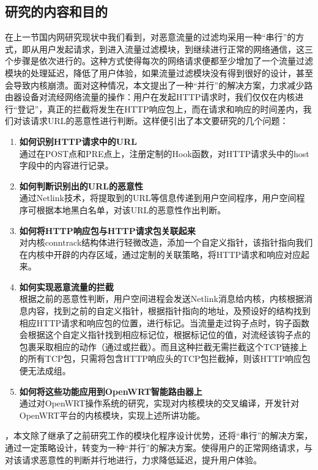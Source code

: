 \documentclass[a4paper,onecolumn,UTF8]{ctexart}
\begin{document}
\subsection{研究的内容和目的}
在上一节国内网研究现状中我们看到，对恶意流量的过滤均采用一种“串行”的方式，即从用户发起请求，到进入流量过滤模块，到继续进行正常的网络通信，这三个步骤是依次进行的。这种方式使得每次的网络请求便都至少增加了一个流量过滤模块的处理延迟，降低了用户体验，如果流量过滤模块没有得到很好的设计，甚至会导致内核崩溃。面对这种情况，本文提出了一种“并行”的解决方案，力求减少路由器设备对流经网络流量的操作：用户在发起HTTP请求时，我们仅仅在内核进行“登记”，真正的拦截将发生在HTTP响应包上，而在请求和响应的时间差内，我们对该请求URL的恶意性进行判断。这样便引出了本文要研究的几个问题：
\begin{enumerate}
  \item \textbf{如何识别HTTP请求中的URL}\\
  通过在POST点和PRE点上，注册定制的Hook函数，对HTTP请求头中的host字段中的内容进行记录。
  \item \textbf{如何判断识别出的URL的恶意性}\\
  通过Netlink技术，将提取到的URL等信息传递到用户空间程序，用户空间程序可根据本地黑白名单，对该URL的恶意性作出判断。
  \item \textbf{如何将HTTP响应包与HTTP请求包关联起来}\\
  对内核conntrack结构体进行轻微改造，添加一个自定义指针，该指针指向我们在内核中开辟的内存区域，通过定制的关联策略，将HTTP请求和响应对应起来。
  \item \textbf{如何实现恶意流量的拦截}\\
  根据之前的恶意性判断，用户空间进程会发送Netlink消息给内核，内核根据消息内容，找到之前的自定义指针，根据指针指向的地址，及预设好的结构找到相应HTTP请求和响应包的位置，进行标记。当流量走过钩子点时，钩子函数会根据这个自定义指针找到相应标记位，根据标记位的值，对流经该钩子点的包裹采取相应的动作（通过或拦截）。而且这种拦截无需拦截这个TCP链接上的所有TCP包，只需将包含HTTP响应头的TCP包拦截掉，则该HTTP响应包便无法成组。
  \item \textbf{如何将这些功能应用到OpenWRT智能路由器上}\\
  通过对OpenWRT操作系统的研究，实现对内核模块的交叉编译，开发针对OpenWRT平台的内核模块，实现上述所讲功能。
\end{enumerate}
\par{}，本文除了继承了之前研究工作的模块化程序设计优势，还将“串行”的解决方案，通过一定策略设计，转变为一种“并行”的解决方案。使得用户的正常网络请求，与对该请求恶意性的判断并行地进行，力求降低延迟，提升用户体验。
\end{document}
